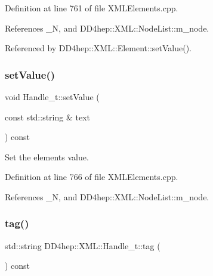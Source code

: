 Definition at line 761 of file X\+M\+L\+Elements.\+cpp.



References \+\_\+N, and D\+D4hep\+::\+X\+M\+L\+::\+Node\+List\+::m\+\_\+node.



Referenced by D\+D4hep\+::\+X\+M\+L\+::\+Element\+::set\+Value().

\hypertarget{class_d_d4hep_1_1_x_m_l_1_1_handle__t_aa9201b6385b1d1be3080fe2d529ec6f7}{}\label{class_d_d4hep_1_1_x_m_l_1_1_handle__t_aa9201b6385b1d1be3080fe2d529ec6f7} 
\subsubsection{\texorpdfstring{set\+Value()}{setValue()}\hspace{0.1cm}{\footnotesize\ttfamily [2/2]}}
{\footnotesize\ttfamily void Handle\+\_\+t\+::set\+Value (\begin{DoxyParamCaption}\item[{const std\+::string \&}]{text }\end{DoxyParamCaption}) const}



Set the element\textquotesingle{}s value. 



Definition at line 766 of file X\+M\+L\+Elements.\+cpp.



References \+\_\+N, and D\+D4hep\+::\+X\+M\+L\+::\+Node\+List\+::m\+\_\+node.

\hypertarget{class_d_d4hep_1_1_x_m_l_1_1_handle__t_ac935379eb28cd33bc36f19c68da66143}{}\label{class_d_d4hep_1_1_x_m_l_1_1_handle__t_ac935379eb28cd33bc36f19c68da66143} 
\subsubsection{\texorpdfstring{tag()}{tag()}}
{\footnotesize\ttfamily std\+::string D\+D4hep\+::\+X\+M\+L\+::\+Handle\+\_\+t\+::tag (\begin{DoxyParamCaption}{ }\end{DoxyParamCaption}) const\hspace{0.3cm}{\ttfamily [inline]}}



